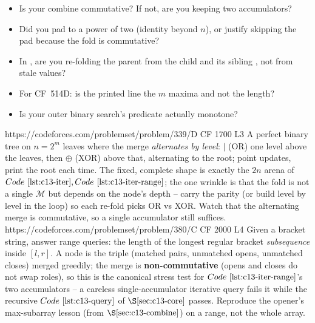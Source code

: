 \begin{stuckbox}
\begin{itemize}[nosep,leftmargin=1.4em]
  \item Is your combine commutative?  If not, are you keeping two accumulators?
  \item Did you pad to a power of two (identity beyond \(n\)), or justify skipping
        the pad because the fold is commutative?
  \item In , are you re-folding the parent from the child and its
        sibling , not from stale values?
  \item For CF~514D: is the printed line the \(m\) maxima and not the length?
  \item Is your outer binary search's predicate actually monotone?
\end{itemize}
\end{stuckbox}

\begin{practiceset}
    {https://codeforces.com/problemset/problem/339/D}
    {CF 1700 L3}
    {A perfect binary tree on \(n=2^m\) leaves where the merge \emph{alternates by
     level}: \(\mid\) (OR) one level above the leaves, then \(\oplus\) (XOR) above
     that, alternating to the root; point updates, print the root each time.  The
     fixed, complete shape is exactly the \(2n\) arena of \(\coderef{c13-iter},
     \coderef{c13-iter-range}\); the one wrinkle is that the fold is not a single
     \(\mathcal{M}\) but depends on the node's depth -- carry the parity (or build
     level by level in the loop) so each re-fold picks OR vs XOR.  Watch that the
     alternating merge is commutative, so a single accumulator still suffices.}
    {https://codeforces.com/problemset/problem/380/C}
    {CF 2000 L4}
    {Given a bracket string, answer range queries: the length of the longest regular
     bracket \emph{subsequence} inside \([l,r]\).  A node is the triple (matched
     pairs, unmatched opens, unmatched closes) merged greedily; the merge is
     \textbf{non-commutative} (opens and closes do not swap roles), so this is the
     canonical stress test for \(\coderef{c13-iter-range}\)'s two accumulators -- a
     careless single-accumulator iterative query fails it while the recursive
     \(\coderef{c13-query}\) of \(\secref{c13-core}\) passes.  Reproduce the opener's
     max-subarray lesson (from \(\secref{c13-combine}\)) on a range, not the whole
     array.}
\end{practiceset}

